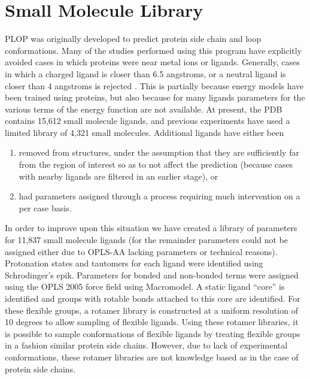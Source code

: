 \section{Small Molecule Library}
\label{section:unsorted/small_molecule_library}
PLOP was originally developed to predict protein side chain and loop conformations.
Many of the studies performed using this program have explicitly avoided cases in which proteins were near metal ions or ligands.
Generally, cases in which a charged ligand is closer than 6.5 angstroms, or a neutral ligand is closer than 4 angstroms is rejected \cite{goldfeld2011successful,miller2013prediction}.
This is partially because energy models have been trained using proteins, but also because for many ligands parameters for the various terms of the energy function are not available.
At present, the PDB contains 15,612 small molecule ligands, and previous experiments have used a limited library of 4,321 small molecules.
Additional ligands have either been
\begin{enumerate}
\item removed from structures, under the assumption that they are sufficiently far from the region of interest so as to not affect the prediction (because cases with nearby ligands are filtered in an earlier stage), or
\item had parameters assigned through a process requiring much intervention on a per case basis.
\end{enumerate}

In order to improve upon this situation we have created a library of parameters for 11,837 small molecule ligands (for the remainder parameters could not be assigned either due to OPLS-AA lacking parameters or technical reasons).
Protonation states and tautomers for each ligand were identified using Schrodinger's epik.
Parameters for bonded and non-bonded terms were assigned using the OPLS 2005 force field using Macromodel.
A static ligand ``core'' is identified and groups with rotable bonds attached to this core are identified.
For these flexible groups, a rotamer library is constructed at a uniform resolution of 10 degrees to allow sampling of flexible ligands.
Using these rotamer libraries, it is possible to sample conformations of flexible ligands by treating flexible groups in a fashion similar protein side chains.
However, due to lack of experimental conformations, these rotamer libraries are not knowledge based as in the case of protein side chains.

